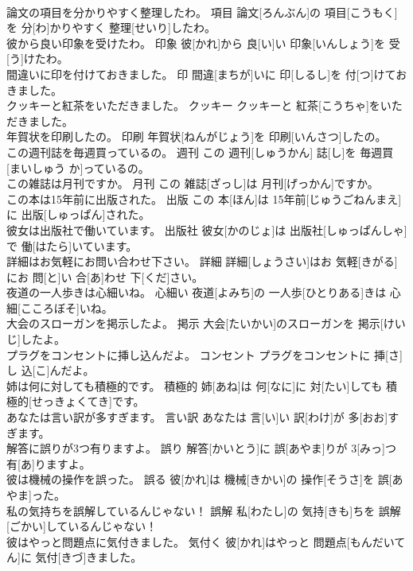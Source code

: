 \documentclass[8pt]{extreport}
\begin{document}
\begin{CJK}{UTF8}{min}
\\	論文の項目を分かりやすく整理したわ。	項目	論文[ろんぶん]の 項目[こうもく]を 分[わ]かりやすく 整理[せいり]したわ。	
\\	彼から良い印象を受けたわ。	印象	彼[かれ]から 良[い]い 印象[いんしょう]を 受[う]けたわ。	
\\	間違いに印を付けておきました。	印	間違[まちが]いに 印[しるし]を 付[つ]けておきました。	
\\	クッキーと紅茶をいただきました。	クッキー	クッキーと 紅茶[こうちゃ]をいただきました。	
\\	年賀状を印刷したの。	印刷	年賀状[ねんがじょう]を 印刷[いんさつ]したの。	
\\	この週刊誌を毎週買っているの。	週刊	この 週刊[しゅうかん] 誌[し]を 毎週買[まいしゅう か]っているの。	
\\	この雑誌は月刊ですか。	月刊	この 雑誌[ざっし]は 月刊[げっかん]ですか。	
\\	この本は15年前に出版された。	出版	この 本[ほん]は 15年前[じゅうごねんまえ]に 出版[しゅっぱん]された。	
\\	彼女は出版社で働いています。	出版社	彼女[かのじょ]は 出版社[しゅっぱんしゃ]で 働[はたら]いています。	
\\	詳細はお気軽にお問い合わせ下さい。	詳細	詳細[しょうさい]はお 気軽[きがる]にお 問[と]い 合[あ]わせ 下[くだ]さい。	
\\	夜道の一人歩きは心細いね。	心細い	夜道[よみち]の 一人歩[ひとりある]きは 心細[こころぼそ]いね。	
\\	大会のスローガンを掲示したよ。	掲示	大会[たいかい]のスローガンを 掲示[けいじ]したよ。	
\\	プラグをコンセントに挿し込んだよ。	コンセント	プラグをコンセントに 挿[さ]し 込[こ]んだよ。	
\\	姉は何に対しても積極的です。	積極的	姉[あね]は 何[なに]に 対[たい]しても 積極的[せっきょくてき]です。	
\\	あなたは言い訳が多すぎます。	言い訳	あなたは 言[い]い 訳[わけ]が 多[おお]すぎます。	
\\	解答に誤りが3つ有りますよ。	誤り	解答[かいとう]に 誤[あやま]りが 3[みっ]つ 有[あ]りますよ。	
\\	彼は機械の操作を誤った。	誤る	彼[かれ]は 機械[きかい]の 操作[そうさ]を 誤[あやま]った。	
\\	私の気持ちを誤解しているんじゃない！	誤解	私[わたし]の 気持[きも]ちを 誤解[ごかい]しているんじゃない！	
\\	彼はやっと問題点に気付きました。	気付く	彼[かれ]はやっと 問題点[もんだいてん]に 気付[きづ]きました。	

\end{CJK}
\end{document}
